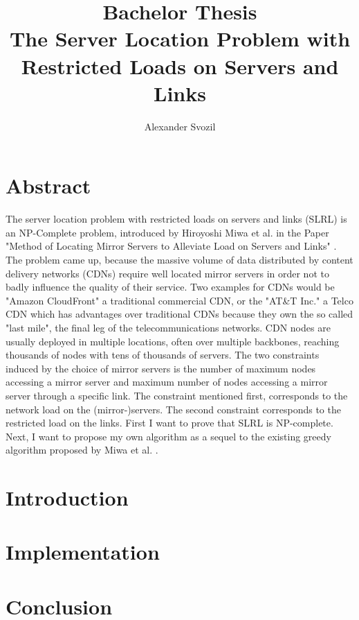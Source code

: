 \documentclass [12pt]{article}
\begin{document}
\author{Alexander Svozil}
\title{Bachelor Thesis \\ The Server Location Problem with Restricted Loads 
on Servers and Links}

\maketitle

\section{Abstract}
The server location problem with restricted loads on servers and links (SLRL) is an NP-Complete
problem, introduced by Hiroyoshi Miwa et al. in the Paper "Method of Locating Mirror Servers
to Alleviate Load on Servers and Links" \cite{mirrorserver}. The problem 
came up, because the massive volume of data distributed by content delivery networks (CDNs) 
require well located mirror servers in order not to badly influence the quality of their service.
Two examples for CDNs would be "Amazon CloudFront" a traditional commercial CDN, or the "AT\&T Inc."
a Telco CDN which has advantages over traditional CDNs because they own the so called "last mile",
the final leg of the telecommunications networks. CDN nodes are usually deployed in multiple 
locations, often over multiple backbones, reaching thousands of nodes with tens of thousands of 
servers. \cite{wiki:cdn} \cite{wiki:lastmile}
The two constraints induced by the choice of mirror servers is the number of maximum nodes
accessing a mirror server and maximum number of nodes accessing a mirror server 
through a specific link. The constraint mentioned first, corresponds to the network load on
the (mirror-)servers. The second constraint corresponds to the restricted load on the links.
First I want to prove that SLRL is NP-complete. Next, I want to propose my own algorithm as a
sequel to the existing greedy algorithm proposed by Miwa et al. \cite{mirrorserver}.


\tableofcontents
\section{Introduction}
\section{Implementation}
\section{Conclusion}



\end{document}
